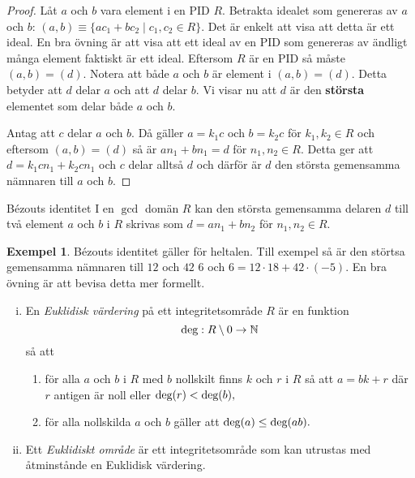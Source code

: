 \documentclass{article}
\newcommand{\grad}[0]{\textnormal{deg}}
\theoremstyle{definition}
\newtheorem{exmp}[thm]{Exempel}
\begin{document}
\begin{proof}
  Låt $a$ och $b$ vara element i en PID $R$. Betrakta idealet som genereras av $a$ och $b$: $(a, b) \equiv \{ ac_1 + bc_2 \; | \; c_1, c_2 \in R \}$.
  Det är enkelt att visa att detta är ett ideal. En bra övning är att visa att ett ideal av en PID som genereras av ändligt många element faktiskt 
  är ett ideal. Eftersom $R$ är en PID så måste $(a, b) = (d)$. Notera att både $a$ och $b$ är element i $(a, b) = (d)$. Detta betyder att 
  $d$ delar $a$ och att $d$ delar $b$. Vi visar nu att $d$ är den \textbf{största} elementet som delar både $a$ och $b$. 

  Antag att $c$ delar $a$ och $b$. Då gäller $a = k_1c$ och $b = k_2c$ för $k_1, k_2 \in R$ och eftersom $(a, b) = (d)$ så är $an_1 + bn_1 = d$
  för $n_1, n_2 \in R$. Detta ger att $d = k_1cn_1 + k_2cn_1$ och $c$ delar alltså $d$ och därför är $d$ den största gemensamma nämnaren till $a$ och $b$.
\end{proof}

\hypertarget{Bezouts identitet}{}
\begin{mykol}{Bézouts identitet}{}
  I en $\gcd$ domän $R$ kan den största gemensamma delaren $d$ till två element $a$ och $b$ i $R$ skrivas som $d = an_1 + bn_2$
  för $n_1, n_2 \in R.$
\end{mykol}
\begin{exmp}
  Bézouts identitet gäller för heltalen. Till exempel så är den störtsa gemensamma nämnaren till $12$ och $42$ $6$ och 
  $6 = 12 \cdot 18 + 42 \cdot (-5).$ En bra övning är att bevisa detta mer formellt. 
\end{exmp}

\begin{mydef}{}{}
  \begin{enumerate}[(i)]
    \item En \textit{Euklidisk värdering} på ett integritetsområde $R$ är en funktion 
    \[ \grad: R \setminus 0 \rightarrow \mathbb{N} \]
    så att 
    \begin{enumerate}
      \item för alla $a$ och $b$ i $R$ med $b$ nollskilt finns $k$ och $r$ i $R$ så att $a = bk + r$ där $r$ antigen är noll eller $\grad (r) < \grad (b),$
      \item för alla nollskilda $a$ och $b$ gäller att $\grad (a) \leq \grad (ab).$
    \end{enumerate}
    \item Ett \textit{Euklidiskt område} är ett integritetsområde som kan utrustas med åtminstånde en Euklidisk värdering.
  \end{enumerate}
\end{mydef}
\end{document}
